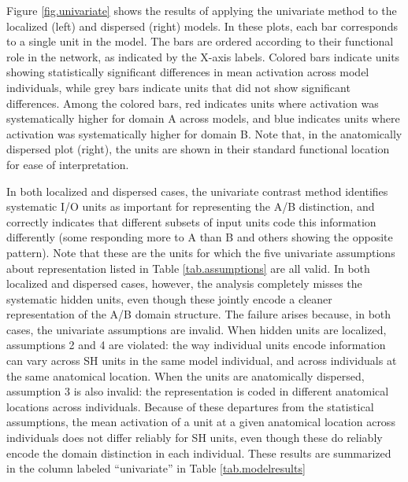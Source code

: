 Figure \ref{fig.univariate} shows the results of applying the univariate method to the localized (left) and dispersed (right) models. In these plots, each bar corresponds to a single unit in the model. The bars are ordered according to their functional role in the network, as indicated by the X-axis labels. Colored bars indicate units showing statistically significant differences in mean activation across model individuals, while grey bars indicate units that did not show significant differences. Among the colored bars, red indicates units where activation was systematically higher for domain A across models, and blue indicates units where activation was systematically higher for domain B. Note that, in the anatomically dispersed plot (right), the units are shown in their standard functional location for ease of interpretation.

In both localized and dispersed cases, the univariate contrast method identifies systematic I/O units as important for representing the A/B distinction, and correctly indicates that different subsets of input units code this information differently (some responding more to A than B and others showing the opposite pattern). Note that these are the units for which the five univariate assumptions about representation listed in Table \ref{tab.assumptions} are all valid. In both localized and dispersed cases, however, the analysis completely misses the systematic hidden units, even though these jointly encode a cleaner representation of the A/B domain structure. The failure arises because, in both cases, the univariate assumptions are invalid. When hidden units are localized, assumptions 2 and 4 are violated: the way individual units encode information can vary across SH units in the same model individual, and across individuals at the same anatomical location. When the units are anatomically dispersed, assumption 3 is also invalid: the representation is coded in different anatomical locations across individuals. Because of these departures from the statistical assumptions, the mean activation of a unit at a given anatomical location across individuals does not differ reliably for SH units, even though these do reliably encode the domain distinction in each individual. These results are summarized in the column labeled ``univariate'' in Table \ref{tab.modelresults}

%	


